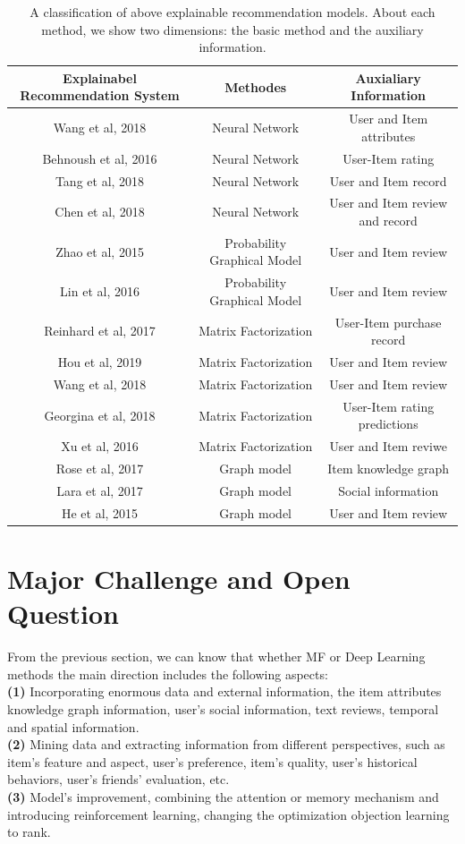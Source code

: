 \documentclass[10pt,twocolumn,letterpaper]{article}
\begin{document}
\begin{table}
\caption{A classification of above explainable recommendation models. About each method, we show two dimensions: the basic method and the auxiliary information.}
\begin{center}
\begin{tabular}{|c|c|c|} 
	\hline 
	Explainabel Recommendation System&Methodes&Auxialiary Information\\
	\hline  
	Wang et al, 2018&Neural Network&User and Item attributes\\
	\hline
	Behnoush et al, 2016&Neural Network&User-Item rating\\ 
	\hline
	Tang et al, 2018&Neural Network&User and Item record\\
	\hline
	Chen et al, 2018&Neural Network&User and Item review and record\\ 
	\hline
	Zhao et al, 2015&Probability Graphical Model&User and Item review\\
	\hline
	Lin et al, 2016&Probability Graphical Model&User and Item review\\
	\hline
	Reinhard et al, 2017&Matrix Factorization&User-Item purchase record\\
	\hline
	Hou et al, 2019&Matrix Factorization&User and Item review\\ 
	\hline
	Wang et al, 2018&Matrix Factorization&User and Item review\\
	\hline
	Georgina et al, 2018&Matrix Factorization&User-Item rating predictions\\
	\hline
	Xu et al, 2016&Matrix Factorization&User and Item reviwe\\  
	\hline
	Rose et al, 2017&Graph model&Item knowledge graph\\
	\hline
	Lara et al, 2017&Graph model&Social information\\ 
	\hline
	He et al, 2015&Graph model&User and Item review\\	\hline
\end{tabular}
\end{center}
\end{table}

\section{Major Challenge and Open Question}
From the previous section, we can know that whether MF or Deep Learning methods the main direction includes the following aspects: \\
{\bf (1)} Incorporating enormous data and external information, the item attributes knowledge graph information, user's social information, text reviews, temporal and spatial information.\\ 
{\bf (2)} Mining data and extracting information from different perspectives, such as item's feature and aspect, user's preference, item's quality, user's historical behaviors, user's friends' evaluation, etc.\\
{\bf (3)} Model's improvement, combining the attention or memory mechanism and introducing reinforcement learning, changing the optimization objection learning to rank.
\end{document}
